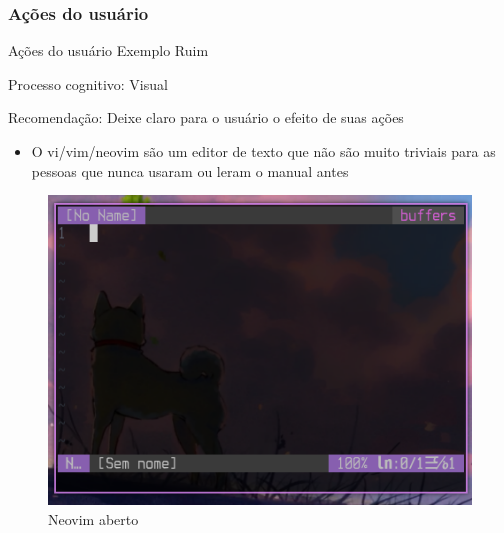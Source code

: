 \documentclass{beamer}
\begin{document}
\subsubsection{Ações do usuário}
\begin{frame}{Ações do usuário Exemplo Ruim}

Processo cognitivo: Visual

Recomendação: Deixe claro para o usuário o efeito de suas ações

\begin{itemize}
    \item O vi/vim/neovim são um editor de texto  que não são muito triviais para as pessoas que nunca usaram ou leram o manual antes 
\end{itemize}
\begin{figure}
    \centering
    \includegraphics[scale=0.4]{images/vim.png}
    \caption{Neovim aberto}
\end{figure}

\end{frame}
\end{document}
